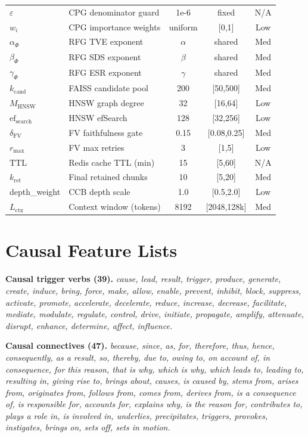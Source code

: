 \documentclass[10pt,twocolumn]{article}
\begin{document}
\begin{table}[H]
\begin{tabular}{@{}llccc@{}}
$\varepsilon$     & CPG denominator guard    & 1e-6 & fixed       & N/A \\
$w_i$             & CPG importance weights   & uniform & [0,1]    & Low \\
$\alpha_\Phi$     & RFG TVE exponent         & $\alpha$ & shared  & Med \\
$\beta_\Phi$      & RFG SDS exponent         & $\beta$  & shared  & Med \\
$\gamma_\Phi$     & RFG ESR exponent         & $\gamma$ & shared  & Med \\
$k_\text{cand}$   & FAISS candidate pool     & 200  & [50,500]    & Med \\
$M_\text{HNSW}$   & HNSW graph degree        & 32   & [16,64]     & Low \\
$\text{ef}_\text{search}$ & HNSW efSearch & 128  & [32,256]    & Low \\
$\delta_\text{FV}$& FV faithfulness gate     & 0.15 & [0.08,0.25] & Med \\
$r_\text{max}$    & FV max retries           & 3    & [1,5]       & Low \\
$\text{TTL}$      & Redis cache TTL (min)    & 15   & [5,60]      & N/A \\
$k_\text{ret}$    & Final retained chunks    & 10   & [5,20]      & Med \\
depth\_weight     & CCB depth scale          & 1.0  & [0.5,2.0]   & Low \\
$L_\text{ctx}$    & Context window (tokens)  & 8192 & [2048,128k] & Med \\
\bottomrule
\end{tabular}
\end{table}

\section{Causal Feature Lists}\label{app:features}

\noindent\textbf{Causal trigger verbs (39).}
\textit{cause, lead, result, trigger, produce, generate, create, induce,
bring, force, make, allow, enable, prevent, inhibit, block, suppress,
activate, promote, accelerate, decelerate, reduce, increase, decrease,
facilitate, mediate, modulate, regulate, control, drive, initiate,
propagate, amplify, attenuate, disrupt, enhance, determine, affect, influence.}

\noindent\textbf{Causal connectives (47).}
\textit{because, since, as, for, therefore, thus, hence, consequently,
as a result, so, thereby, due to, owing to, on account of, in consequence,
for this reason, that is why, which is why, which leads to, leading to,
resulting in, giving rise to, brings about, causes, is caused by,
stems from, arises from, originates from, follows from, comes from,
derives from, is a consequence of, is responsible for, accounts for,
explains why, is the reason for, contributes to, plays a role in,
is involved in, underlies, precipitates, triggers, provokes, instigates,
brings on, sets off, sets in motion.}
\end{document}
